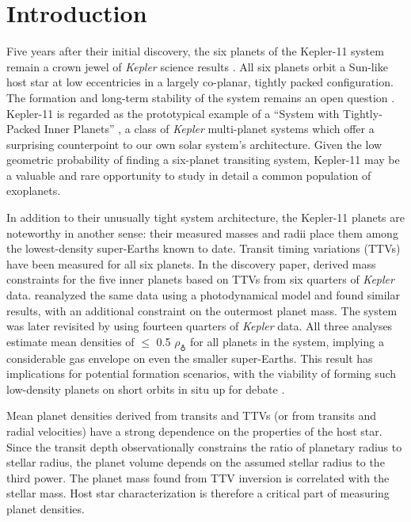 \documentclass[oneside]{emulateapj}
\begin{document}
\section{Introduction}

Five years after their initial discovery, the six planets of the Kepler-11 system remain a crown jewel of \textit{Kepler} science results \citep{Lissauer2011}. All six planets orbit a Sun-like host star at low eccentricies in a largely co-planar, tightly packed configuration. The formation and long-term stability of the system remains an open question \citep[see e.g.][]{Ikoma2012, Hands2014, Mahajan2014}. Kepler-11 is regarded as the prototypical example of a ``System with Tightly-Packed Inner Planets'' \citep[STIP,][]{Boley2014}, a class of \textit{Kepler} multi-planet systems which offer a surprising counterpoint to our own solar system's architecture. Given the low geometric probability of finding a six-planet transiting system, Kepler-11 may be a valuable and rare opportunity to study in detail a common population of exoplanets.

In addition to their unusually tight system architecture, the Kepler-11 planets are noteworthy in another sense: their measured masses and radii place them among the lowest-density super-Earths known to date. Transit timing variations (TTVs) have been measured for all six planets. In the discovery paper, \citet{Lissauer2011} derived mass constraints for the five inner planets based on TTVs from six quarters of \textit{Kepler} data. \citet{Migaszewski2012} reanalyzed the same data using a photodynamical model and found similar results, with an additional constraint on the outermost planet mass. The system was later revisited by \citet{Lissauer2013} using fourteen quarters of \textit{Kepler} data. All three analyses estimate mean densities of $\leq$ 0.5 $\rho_{\earth}$ for all planets in the system, implying a considerable gas envelope on even the smaller super-Earths. This result has implications for potential formation scenarios, with the viability of forming such low-density planets on short orbits in situ up for debate \citep[e.g.][]{Lopez2012, Bodenheimer2014, Howe2015}.

Mean planet densities derived from transits and TTVs (or from transits and radial velocities) have a strong dependence on the properties of the host star. Since the transit depth observationally constrains the ratio of planetary radius to stellar radius, the planet volume depends on the assumed stellar radius to the third power. The planet mass found from TTV inversion is correlated with the stellar mass. Host star characterization is therefore a critical part of measuring planet densities.
\end{document}
